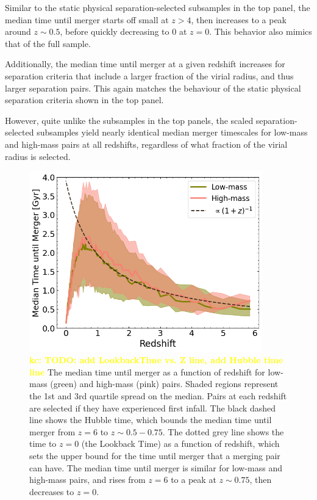 \documentclass[twocolumn,linenumbers]{aastex631}
\newcommand{\kc}[1]{\textcolor{yellow}{\textbf{kc: #1}} }
\begin{document}
Similar to the static physical separation-selected subsamples in the top panel, the median time until merger starts off small at $z>4$, then increases to a peak around $z\sim0.5$, before quickly decreasing to 0 at $z=0$. 
This behavior also mimics that of the full sample. 

Additionally, the median time until merger at a given redshift increases for separation criteria that include a larger fraction of the virial radius, and thus larger separation pairs. 
This again matches the behaviour of the static physical separation criteria shown in the top panel.

However, quite unlike the subsamples in the top panels, the scaled separation-selected subsamples yield nearly identical median merger timescales for low-mass and high-mass pairs at all redshifts, regardless of what fraction of the virial radius is selected. 






\begin{figure}[htb]
    \centering
    \includegraphics[width=0.9\textwidth]{plots/bet-on-it/3_time_til_merger_full_fit.png}
    \caption{\kc{TODO: add LookbackTime vs. Z line, add Hubble time line} The median time until merger as a function of redshift for low-mass (green) and high-mass (pink) pairs. Shaded regions represent the 1st and 3rd quartile spread on the median. Pairs at each redshift are selected if they have experienced first infall. 
    The black dashed line shows the Hubble time, which bounds the median time until merger from $z=6$ to $z\sim0.5-0.75$.
    The dotted grey line shows the time to $z=0$ (the Lookback Time) as a function of redshift, which sets the upper bound for the time until merger that a merging pair can have. 
    The median time until merger is similar for low-mass and high-mass pairs, and rises from $z=6$ to a peak at $z\sim0.75$, then decreases to $z=0$.}
    \label{fig:timescales}
\end{figure}
\end{document}
